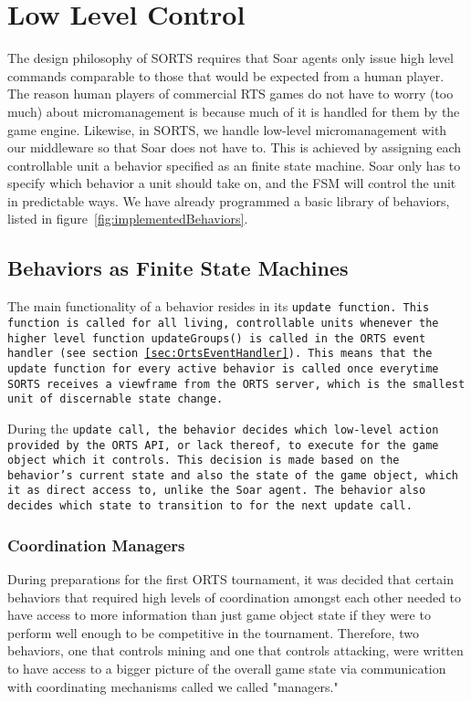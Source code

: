 \documentclass{report}
\begin{document}
\section{Low Level Control}

The design philosophy of SORTS requires that Soar agents only issue high
level commands comparable to those that would be expected from a human
player. The reason human players of commercial RTS games do not have to
worry (too much) about micromanagement is because much of it is handled
for them by the game engine. Likewise, in SORTS, we handle low-level
micromanagement with our middleware so that Soar does not have to. This
is achieved by assigning each controllable unit a behavior specified
as an finite state machine. Soar only has to specify which behavior a
unit should take on, and the FSM will control the unit in predictable
ways. We have already programmed a basic library of behaviors, listed in
figure~\ref{fig:implementedBehaviors}.

\subsection{Behaviors as Finite State Machines}

The main functionality of a behavior resides in its \tt{update}
function. This function is called for all living, controllable units
whenever the higher level function \verb|updateGroups()| is called in
the ORTS event handler (see section~\ref{sec:OrtsEventHandler}). This
means that the \tt{update} function for every active behavior is called
once everytime SORTS receives a viewframe from the ORTS server, which is
the smallest unit of discernable state change.

During the \tt{update} call, the behavior decides which low-level action
provided by the ORTS API, or lack thereof, to execute for the game
object which it controls. This decision is made based on the behavior's
current state and also the state of the game object, which it as direct
access to, unlike the Soar agent. The behavior also decides which state
to transition to for the next \tt{update} call.

\subsubsection{Coordination Managers}

During preparations for the first ORTS tournament, it was decided that
certain behaviors that required high levels of coordination amongst
each other needed to have access to more information than just game
object state if they were to perform well enough to be competitive in
the tournament. Therefore, two behaviors, one that controls mining and
one that controls attacking, were written to have access to a bigger
picture of the overall game state via communication with coordinating
mechanisms called we called "managers."
\end{document}
